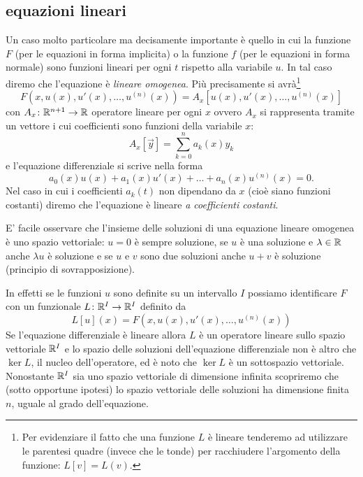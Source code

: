 \subsection{equazioni lineari}

Un caso molto particolare ma decisamente importante è quello in cui la funzione
$F$ (per le equazioni in forma implicita) o la funzione $f$
(per le equazioni in forma normale) sono funzioni lineari
per ogni $t$
rispetto alla variabile $u$.
In tal caso diremo che l'equazione è
%
%
\emph{lineare omogenea}.
Più precisamente si avrà\footnote{%
Per evidenziare il fatto che una funzione $L$ è lineare tenderemo ad utilizzare 
le parentesi quadre (invece che le tonde) per racchiudere l'argomento della 
funzione: $L[v] = L(v)$.
}
\[
F(x,u(x),u'(x), \dots, u^{(n)}(x)) = A_x[u(x), u'(x), \dots, u^{(n)}(x)]
\]
con $A_x\colon \mathbb R^{n+1}\to \mathbb R$
operatore lineare per ogni $x$ ovvero $A_x$ si rappresenta tramite un vettore
i cui coefficienti sono funzioni della variabile $x$:
\[
  A_x[\vec y] = \sum_{k=0}^n a_k(x) y_k
\]
e l'equazione differenziale si scrive nella forma
\[
  a_0(x) u(x) + a_1(x) u'(x) + \dots + a_n(x) u^{(n)}(x) = 0.
\]
Nel caso in cui i coefficienti $a_k(t)$ non dipendano da $x$
(cioè siano funzioni costanti) diremo che l'equazione è
lineare
%
%
\emph{a coefficienti costanti}.

E' facile osservare che l'insieme delle soluzioni di una equazione lineare 
omogenea è uno spazio vettoriale: $u=0$ è sempre soluzione, 
se $u$ è una soluzione e $\lambda \in \mathbb R$ anche $\lambda u$ è soluzione 
e se $u$ e $v$ sono due soluzioni anche $u+v$ è soluzione
%
%
(principio di sovrapposizione).

In effetti
se le funzioni $u$ sono definite su un intervallo $I$ possiamo
identificare $F$ con un funzionale $L\colon \mathbb R^I \to \mathbb R^I$ definito da
\[
  L[u](x) = F(x,u(x), u'(x), \dots, u^{(n)}(x))
\]
Se l'equazione differenziale è lineare allora $L$ è un operatore lineare
sullo spazio vettoriale $\mathbb R^I$ e lo spazio delle soluzioni dell'equazione
differenziale non è altro che $\ker L$, il nucleo dell'operatore,
ed è noto che $\ker L$ è un sottospazio vettoriale.
Nonostante $\mathbb R^I$ sia uno spazio vettoriale di dimensione infinita scopriremo
che (sotto opportune ipotesi) lo spazio vettoriale delle soluzioni
ha dimensione finita $n$, uguale al grado dell'equazione.

